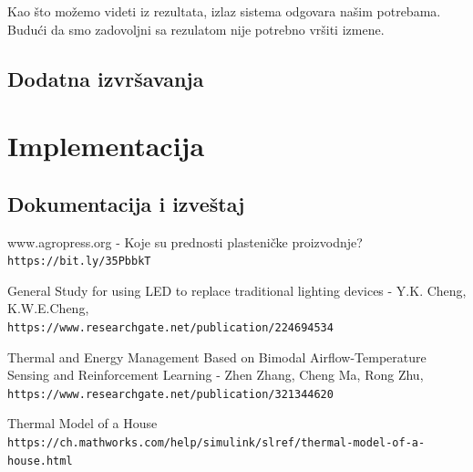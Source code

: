 \documentclass[a4paper,11pt]{book}
\begin{document}
Kao što možemo videti iz rezultata, izlaz sistema odgovara našim potrebama. Budući da smo zadovoljni sa rezulatom nije potrebno vršiti izmene.

\section{Dodatna izvršavanja}

\chapter{Implementacija}

\section{Dokumentacija i izveštaj}

\begin{thebibliography}{9}

  www.agropress.org - Koje su prednosti plasteničke proizvodnje?
  \\\texttt{https://bit.ly/35PbbkT}

   
  General Study for using LED to replace traditional lighting devices - Y.K. Cheng, K.W.E.Cheng,
  \\\texttt{https://www.researchgate.net/publication/224694534}

  Thermal and Energy Management Based on Bimodal Airflow-Temperature Sensing and Reinforcement Learning - Zhen Zhang, Cheng Ma, Rong Zhu,
  \\\texttt{https://www.researchgate.net/publication/321344620}

  Thermal Model of a House
  \\\texttt{https://ch.mathworks.com/help/simulink/slref/thermal-model-of-a-house.html}

  \end{thebibliography}
\end{document}
